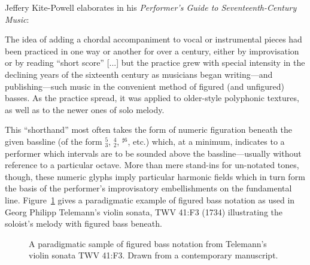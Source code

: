     Jeffery Kite-Powell elaborates in his \textit{Performer's Guide to Seventeenth-Century Music}: 

        \begin{smallquote}
            The idea of adding a chordal accompaniment to vocal or instrumental pieces had been practiced in one way or another for over a century, either by improvisation or by reading ``short score'' [...] but the practice grew with special intensity in the declining years of the sixteenth century as musicians began writing---and publishing---such music in the convenient method of figured (and unfigured) basses. As the practice spread, it was applied to older-style polyphonic textures, as well as to the newer ones of solo melody.\autocite[317]{Kite-Powell_2012}
        \end{smallquote}

    This ``shorthand'' most often takes the form of numeric figuration beneath the given bassline (of the form $^{5}_{3}$, $^{4}_{2}$, $^{\sharp6}$, etc.) which, at a minimum, indicates to a performer which intervals are to be sounded above the bassline---usually without reference to a particular octave. More than mere stand-ins for un-notated tones, though, these numeric glyphs imply particular harmonic fields which in turn form the basis of the performer's improvisatory embellishments on the fundamental line. Figure~\ref{fig:figuredbass} gives a paradigmatic example of figured bass notation as used in Georg Philipp Telemann's violin sonata, TWV 41:F3 (1734) illustrating the soloist's melody with figured bass beneath.
    
      \begin{figure}
            \centering
            \captionsetup{width=.5\textwidth}
            \caption[A paradigmatic sample of figured bass notation from Telemann's violin sonata TWV 41:F3. Drawn from a contemporary manuscript.]{A paradigmatic sample of figured bass notation from Telemann's violin sonata TWV 41:F3. Drawn from a contemporary manuscript.\footnotemark}
            \label{fig:figuredbass}
        \end{figure}

